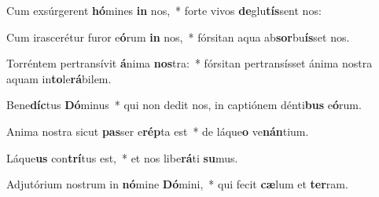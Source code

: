 \item Cum exsúrgerent \textbf{hó}mines \textbf{in} nos,~* forte vivos \textbf{de}glu\textbf{tís}sent nos:
\item Cum irascerétur furor e\textbf{ó}rum \textbf{in} nos,~* fórsitan aqua ab\textbf{sor}bu\textbf{ís}set nos.
\item Torréntem pertransívit \textbf{á}nima \textbf{nos}tra:~* fórsitan pertransísset ánima nostra aquam in\textbf{to}le\textbf{rá}bilem.
\item Bene\textbf{díc}tus \textbf{Dó}minus~* qui non dedit nos, in captiónem dénti\textbf{bus} e\textbf{ó}rum.
\item Anima nostra sicut \textbf{pas}ser e\textbf{rép}ta est~* de láque\textbf{o} ve\textbf{nán}tium.
\item Láque\textbf{us} con\textbf{trí}tus est,~* et nos libe\textbf{rá}ti \textbf{su}mus.
\item Adjutórium nostrum in \textbf{nó}mine \textbf{Dó}mini,~* qui fecit \textbf{cæ}lum et \textbf{ter}ram.
